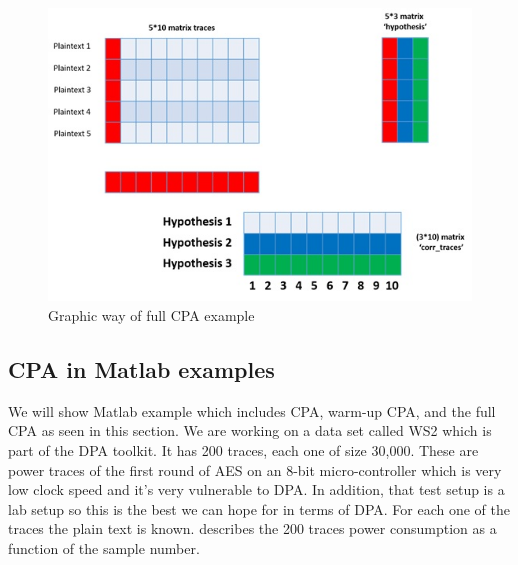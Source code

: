 \begin{figure}[!ht]
    \centering
    \includegraphics[width=1.0\textwidth]{images/chapter8/cpa_example.jpg}
    \caption{Graphic way of full CPA example} \label{c8_cpa_example:fig}
\end{figure}

\subsection{CPA in Matlab examples}\label{c6_Matlab_CPA_example:subsec}

We will show Matlab example which includes CPA, warm-up CPA, and the full CPA as
seen in this section. We are working on a data set called WS2 which is part of
the DPA toolkit. It has 200 traces, each one of size 30,000. These are power
traces of the first round of AES on an 8-bit micro-controller which is very low
clock speed and it's very vulnerable to DPA. In addition, that test setup is a
lab setup so this is the best we can hope for in terms of DPA. For each one of
the traces the plain text is known. 
describes the 200 traces power consumption as a function of the sample number. 

